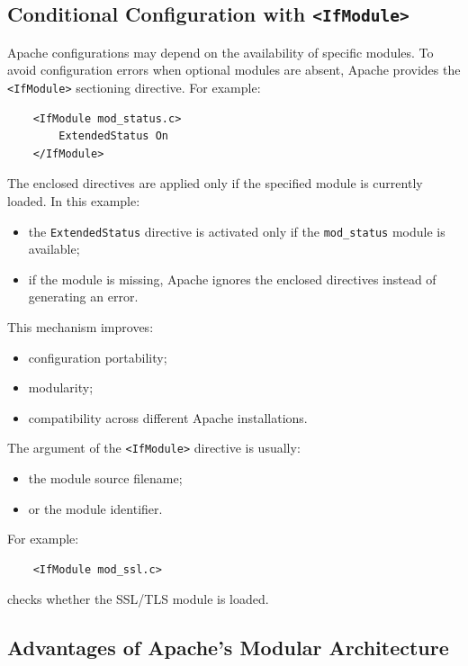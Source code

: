 \documentclass{scrbook}
\begin{document}
	\subsection{Conditional Configuration with \texttt{<IfModule>}}
	
	Apache configurations may depend on the availability of specific modules. To avoid configuration errors when optional modules are absent, Apache provides the \texttt{<IfModule>} sectioning directive. For example:
	
	\begin{lstlisting}
	<IfModule mod_status.c>
		ExtendedStatus On
	</IfModule>
	\end{lstlisting}
	
	The enclosed directives are applied only if the specified module is currently loaded. In this example:
	\begin{itemize}
		\item the \texttt{ExtendedStatus} directive is activated only if the \texttt{mod\_status} module is available;
		
		\item if the module is missing, Apache ignores the enclosed directives instead of generating an error.
	\end{itemize}
	
	This mechanism improves:
	\begin{itemize}
		\item configuration portability;
		
		\item modularity;
		
		\item compatibility across different Apache installations.
	\end{itemize}
	
	The argument of the \texttt{<IfModule>} directive is usually:
	\begin{itemize}
		\item the module source filename;
		
		\item or the module identifier.
	\end{itemize}
	
	For example:
	
	\begin{lstlisting}
	<IfModule mod_ssl.c>
	\end{lstlisting}
	
	checks whether the SSL/TLS module is loaded.
	
	\subsection{Advantages of Apache's Modular Architecture}
	
\end{document}
